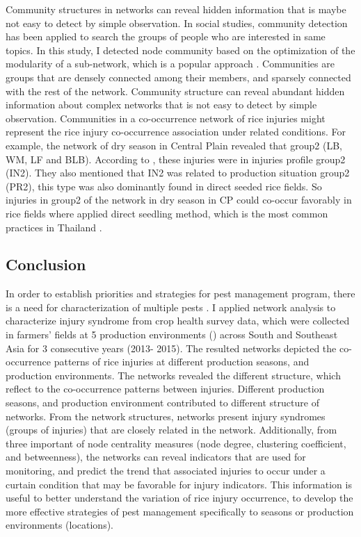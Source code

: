 Community structures in networks can reveal hidden information that is maybe not easy to detect by simple observation. In social studies, community detection has been applied to search the groups of people who are interested in same topics.   In this study, I detected node community based on the optimization of the modularity of a sub-network, which is a popular approach \cite{Liu_2014_Detecting}. Communities are groups that are densely connected among their members, and sparsely connected with the rest of the network. Community structure can reveal abundant hidden information about complex networks that is not easy to detect by simple observation. Communities in a co-occurrence network of rice injuries might represent the rice injury co-occurrence association under related conditions. For example, the network of dry season in Central Plain revealed that group2 (LB, WM, LF and BLB).  According to \citet{Savary_2000_Characterization}, these injuries were in injuries profile group2 (IN2). They also mentioned that IN2 was related to production situation group2 (PR2), this type was also dominantly found in direct seeded rice fields. So injuries in group2 of the network in dry season in CP could co-occur favorably in rice fields where applied direct seedling method, which is the most common practices in Thailand \citep{IRRI_2013_Rice}. 


\subsection{Conclusion}

In order to establish priorities and strategies for pest management program, there is a need for characterization of multiple pests \citep{Mew_2004_Looking}. I applied network analysis to characterize injury syndrome from crop health survey data, which were collected in farmers’ fields at 5 production environments () across South and Southeast Asia for 3 consecutive years (2013- 2015). The resulted networks depicted the co-occurrence patterns of rice injuries at different production seasons, and production environments. The networks revealed the different structure, which reflect to the co-occurrence patterns between injuries. Different production seasons, and production environment contributed to different structure of networks. From the network structures, networks present injury syndromes (groups of injuries) that are closely related in the network. Additionally, from three important of node centrality measures (node degree, clustering coefficient, and betweenness), the networks can reveal indicators that are used for monitoring, and predict the trend that associated injuries to occur under a curtain condition that may be favorable for injury indicators. This information is useful to better understand the variation of rice injury occurrence, to develop the more effective strategies of pest management specifically to seasons or production environments (locations).

